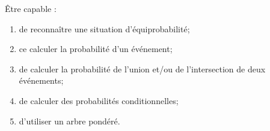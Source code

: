 \begin{myobj}
	Être capable : 
	\begin{enumerate}
		\item de reconnaître une situation d'équiprobabilité;
		\item ce calculer la probabilité d'un événement; 
		\item de calculer la probabilité de l'union et/ou de l'intersection de deux événements;
		\item de calculer des probabilités conditionnelles;
		\item d'utiliser un arbre pondéré.
	\end{enumerate}
\end{myobj}